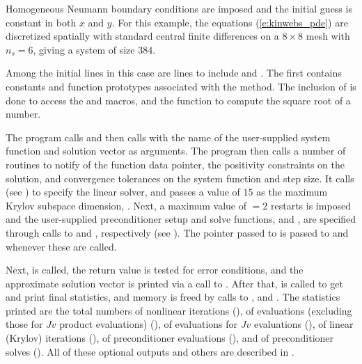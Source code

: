 Homogeneous Neumann boundary conditions are imposed and the initial
guess is constant in both $x$ and $y$. For this example, the equations
(\ref{e:kinwebs_pde}) are discretized spatially with standard central finite
differences on a $8 \times 8$ mesh with $n_s = 6$, giving a system of size $384$.

Among the initial  lines in this case are lines to
include  and .  The first contains
constants and function prototypes associated with the {\spgmr} method.
The inclusion of  is done to access the  and
 macros, and the  function to compute the square root
of a  number.

The  program calls  and then calls  with the
name of the user-supplied system function  and solution vector as
arguments.  The  program then calls a number of 
routines to notify {\kinsol} of the function data pointer, the
positivity constraints on the solution, and convergence tolerances on
the system function and step size.
It calls   (see ) to specify the {\kinspgmr} 
linear solver, and passes a  value of $15$ as the maximum Krylov subspace dimension,
.  Next, a maximum value of  $=2$ restarts is imposed and
the user-supplied preconditioner setup and solve functions,  and
, are specified through calls to  and
, respectively (see ). 
The  pointer passed to  is passed to  
and  whenever these are called. 

Next,  is called, the return value is tested for error conditions, and
the approximate solution vector is printed via a call to .
After that,  is called to get and print final statistics, and
memory is freed by calls to ,  and .
The statistics printed are the total numbers of nonlinear iterations (),
of  evaluations (excluding those for $Jv$ product evaluations) (),
of  evaluations for $Jv$ evaluations (), of linear (Krylov)
iterations (), of preconditioner evaluations (), and of
preconditioner solves (). All of these optional outputs and others are
described in .

